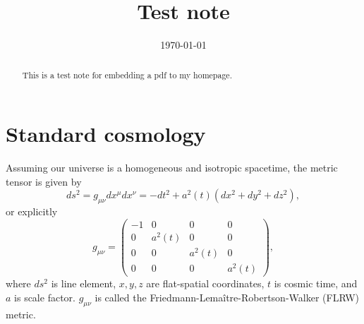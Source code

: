 \documentclass[11pt, a4paper]{article}
\title{Test note}
\author{}
\date{\today}
\begin{document}
\maketitle
\begin{abstract}
    This is a test note for embedding a pdf to my homepage.
\end{abstract}
\section{Standard cosmology}
Assuming our universe is a homogeneous and isotropic spacetime, the metric tensor is given by 
\begin{equation}
    ds^2 = g_{\mu \nu} dx^\mu dx^\nu = -dt^2 + a^2\left( t \right) \left( dx^2 + dy^2 + dz^2 \right),
\end{equation}
or explicitly
\begin{equation}
    g_{\mu \nu} = 
    \begin{pmatrix}
        -1 & 0 & 0 & 0 \\
        0 & a^2\left( t \right) & 0 & 0 \\
        0 & 0 & a^2\left( t \right) & 0\\
        0 & 0 & 0 & a^2\left( t \right)
    \end{pmatrix},
\end{equation}
where $ds^2$ is line element, $x,y,z$ are flat-spatial coordinates, $t$ is cosmic time, and $a$ is scale factor.
$g_{\mu \nu}$ is called the Friedmann-Lemaître-Robertson-Walker (FLRW) metric.
\end{document}
